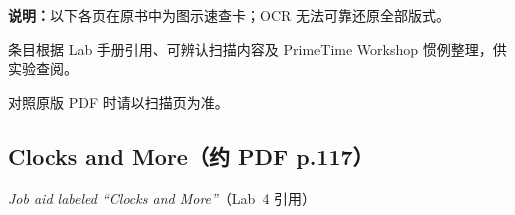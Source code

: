 \label{jobaid:other-pages}



\begin{noteBox}

\textbf{说明：}以下各页在原书中为图示速查卡；OCR 无法可靠还原全部版式。

条目根据 Lab 手册引用、可辨认扫描内容及 PrimeTime Workshop 惯例整理，供实验查阅。

对照原版 PDF 时请以扫描页为准。

\end{noteBox}



\subsection{Clocks and More（约 PDF p.117）}

\label{jobaid:clocks}



\noindent\textit{Job aid labeled ``Clocks and More''}（Lab~4 引用）



